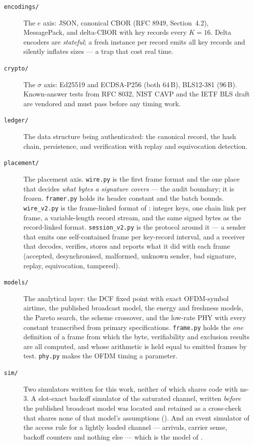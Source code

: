 \begin{description}
\item[\texttt{encodings/}] The $e$ axis: JSON, canonical CBOR (RFC 8949, Section~4.2), MessagePack, and
delta-CBOR with key records every $K = 16$. Delta encoders are \emph{stateful}; a fresh instance per
record emits all key records and silently inflates sizes --- a trap that cost real time.

\item[\texttt{crypto/}] The $\sigma$ axis: Ed25519 and ECDSA-P256 (both $64$\,B), BLS12-381
($96$\,B). Known-answer tests from RFC 8032, NIST CAVP and the IETF BLS draft are vendored and must
pass before any timing work.

\item[\texttt{ledger/}] The data structure being authenticated: the canonical record, the hash
chain, persistence, and verification with replay and equivocation detection.

\item[\texttt{placement/}] The placement axis. \texttt{wire.py} is the first frame format and the
one place that decides \emph{what bytes a signature covers} --- the audit boundary; it is frozen.
\texttt{framer.py} holds its header constant and the batch bounds. \texttt{wire\_v2.py} is the
frame-linked format of : integer keys, one chain link per frame, a variable-length
record stream, and the same signed bytes as the record-linked format. \texttt{session\_v2.py} is the
protocol around it --- a sender that emits one self-contained frame per key-record interval, and a
receiver that decodes, verifies, stores and reports what it did with each frame (accepted,
desynchronised, malformed, unknown sender, bad signature, replay, equivocation, tampered).

\item[\texttt{models/}] The analytical layer: the DCF fixed point with exact OFDM-symbol airtime,
the published broadcast model, the energy and freshness models, the Pareto search, the scheme
crossover, and the low-rate PHY with every constant transcribed from primary specifications.
\texttt{frame.py} holds the \emph{one} definition of a frame from which the byte, verifiability
and exclusion results are all computed, and whose arithmetic is held equal to emitted frames by
test. \texttt{phy.py} makes the OFDM timing a parameter.

\item[\texttt{sim/}] Two simulators written for this work, neither of which shares code with
ns-3. A slot-exact backoff simulator of the saturated channel, written \emph{before} the
published broadcast model was located and retained as a cross-check that shares none of that
model's assumptions (). And an event simulator of the access rule for a
lightly loaded channel --- arrivals, carrier sense, backoff counters and nothing else --- which
is the model of .


\end{description}
